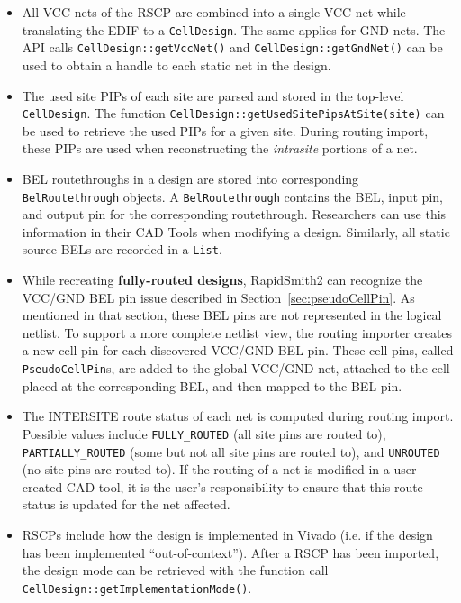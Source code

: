 \begin{itemize}
  \item All VCC nets of the RSCP are combined into a single VCC net while
  translating the EDIF to a \texttt{Cell\-Design}. The same applies for GND
  nets.
  The API calls \texttt{CellDesign::get\-VccNet()} and
  \texttt{CellDesign::get\-GndNet()} can be used to obtain a handle to each
  static net in the design.
  
  \item The used site PIPs of each site are parsed and stored in the top-level
  \texttt{Cell\-Design}. The function
  \texttt{CellDes\-ign::getUsedSitePipsAtSite(site)} can be used to retrieve the
  used PIPs for a given site. During routing import, these PIPs are used when
  reconstructing the \textit{intrasite} portions of a net.
  
  \item BEL routethroughs in a design are stored into corresponding
  \texttt{BelRoutethrough} objects. A \texttt{BelRouteth\-rough} contains the
  BEL, input pin, and output pin for the corresponding routethrough. Researchers
  can use this information in their CAD Tools when modifying a design.
  Similarly, all static source BELs are recorded in a \texttt{List}.
  
  \item While recreating \textbf{fully-routed designs}, RapidSmith2 can
  recognize the VCC/GND BEL pin issue described in Section~\ref{sec:pseudoCellPin}.
  As mentioned in that section, these BEL pins are not represented in the
  logical netlist. To support a more complete netlist view, the
  routing importer creates a new cell pin for each discovered VCC/GND BEL
  pin. These cell pins, called \texttt{PseudoCellPin}s, are added
  to the global VCC/GND net, attached to the cell placed at the
  corresponding BEL, and then mapped to the BEL pin.
  
  \item The INTERSITE route status of each net is computed during routing
  import. Possible values include \texttt{FULLY\_RO\-UTED} (all site pins are
  routed to), \texttt{PARTIALLY\_ROU\-TED} (some but not all site pins are
  routed to), and \texttt{UNROU\-TED} (no site pins are routed to). If the
  routing of a net is modified in a user-created CAD tool, it is the user's
  responsibility to ensure that this route status is updated for the net
  affected.
  
  \item RSCPs include how the design is implemented in Vivado (i.e. if the
  design has been implemented ``out-of-context''). After a RSCP has been
  imported, the design mode can be retrieved with the function call
  \texttt{CellDe\-sign::getImplementationMode()}.
  
\end{itemize}

